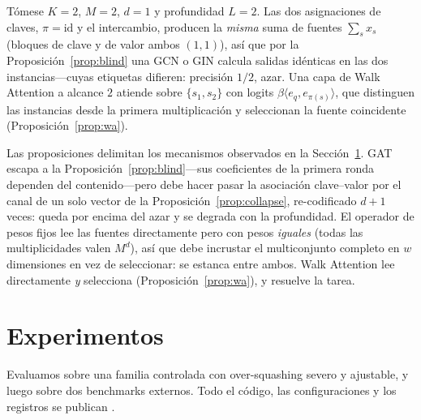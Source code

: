 \documentclass[runningheads]{llncs}
\begin{document}
\begin{example}\label{ex:blind}
Tómese $K=2$, $M=2$, $d=1$ y profundidad $L=2$. Las dos asignaciones de claves,
$\pi=\mathrm{id}$ y el intercambio, producen la \emph{misma} suma de fuentes
$\sum_s x_s$ (bloques de clave y de valor ambos $(1,1)$), así que por la
Proposición~\ref{prop:blind} una GCN o GIN calcula salidas idénticas en las dos
instancias---cuyas etiquetas difieren: precisión $1/2$, azar. Una capa de Walk
Attention a alcance $2$ atiende sobre $\{s_1,s_2\}$ con logits
$\beta\langle e_q,e_{\pi(s)}\rangle$, que distinguen las instancias desde la
primera multiplicación y seleccionan la fuente coincidente
(Proposición~\ref{prop:wa}).
\end{example}

\begin{remark}\label{rem:mechanisms}
Las proposiciones delimitan los mecanismos observados en la
Sección~\ref{sec:exp}. GAT escapa a la Proposición~\ref{prop:blind}---sus
coeficientes de la primera ronda dependen del contenido---pero debe hacer pasar
la asociación clave--valor por el canal de un solo vector de la
Proposición~\ref{prop:collapse}, re-codificado $d+1$ veces: queda por encima
del azar y se degrada con la profundidad. El operador de pesos fijos lee las
fuentes directamente pero con pesos \emph{iguales} (todas las multiplicidades
valen $M^d$), así que debe incrustar el multiconjunto completo en $w$
dimensiones en vez de seleccionar: se estanca entre ambos. Walk Attention lee
directamente \emph{y} selecciona (Proposición~\ref{prop:wa}), y resuelve la
tarea.
\end{remark}

\section{Experimentos}\label{sec:exp}

Evaluamos sobre una familia controlada con over-squashing severo y ajustable, y
luego sobre dos benchmarks externos. Todo el código, las configuraciones y los
registros se publican \cite{repo_walkattention}.
\end{document}
